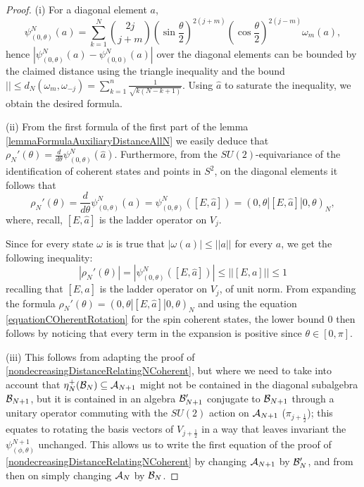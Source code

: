 \begin{proof}
(i) For a diagonal element $a$,  
\begin{equation*}
    \psi^N_{(0, \theta)}(a) = \sum_{k = 1}^N \binom{2j}{j+m} (\sin \frac{\theta}{2})^{2(j+m)} (\cos \frac{\theta}{2})^{2(j-m)} \omega_m(a),
\end{equation*}
hence $|\psi^N_{(0, \theta)}(a) - \psi^N_{(0, 0)}(a)|$ over the diagonal elements can be bounded by the claimed distance using the triangle inequality and the bound $|| \leq d_N(\omega_m, \omega_{-j}) = \sum_{k = 1}^n \frac{1}{\sqrt{k(N - k+1)}}$. Using $\hat a$ to saturate the inequality, we obtain the desired formula.

(ii) From the first formula of the first part of the lemma \ref{lemmaFormulaAuxiliaryDistanceAllN} we easily deduce that $\rho_N'(\theta) = \frac{d}{d\theta} \psi^N_{(0, \theta)} (\hat a)$. Furthermore, from the $SU(2)$-equivariance of the identification of coherent states and points in $S^2$, on the diagonal elements it follows that 
\begin{equation}
    \rho_N'(\theta) 
        =\frac{d}{d\theta} \psi^N_{(0, \theta)} (\hat a) 
        = \psi^N_{(0, \theta)}([E, \hat a])
        = (0, \theta| [E, \hat a] |0, \theta)_N,
\end{equation} 
where, recall, $[E, \hat a]$ is the ladder operator on $V_j$.

Since for every state $\omega$ is is true that $|\omega(a)| \leq ||a||$ for every $a$, we get the following inequality:
\begin{equation*}
    |\rho_N'(\theta)| = |\psi^N_{(0, \theta)}([E, \hat a])| \leq ||[E, a]|| \leq 1
\end{equation*}
recalling that $[E, \hat a]$ is the ladder operator on $V_j$, of unit norm. From expanding the formula $\rho_N'(\theta) = (0, \theta| [E, \hat a] |0, \theta)_N$ and using the equation \eqref{equationCOherentRotation} for the spin coherent states, the lower bound $0$ then follows by noticing that every term in the expansion is positive since $\theta \in [0, \pi]$.

(iii) This follows from adapting the proof of \ref{nondecreasingDistanceRelatingNCoherent}, but where we need to take into account that $\eta^+_N(\mathcal B_N) \subseteq \mathcal A_{N+1}$ might not be contained in the diagonal subalgebra $\mathcal B_{N+1}$, but it is contained in an algebra $\mathcal B_{N+1}'$ conjugate to $\mathcal B_{N+1}$ through a unitary operator commuting with the $SU(2)$ action on $\mathcal A_{N+1}$ ($\pi_{j + \frac{1}{2}}$); this equates to rotating the basis vectors of $V_{j + \frac{1}{2}}$ in a way that leaves invariant the $\psi^{N+1}_{(\phi, \theta)}$ unchanged. This allows us to write the first equation of the proof of \ref{nondecreasingDistanceRelatingNCoherent} by changing $\mathcal A_{N+1}$ by $\mathcal B'_N$, and from then on simply changing $\mathcal A_N$ by $\mathcal B_N$.
\end{proof}


